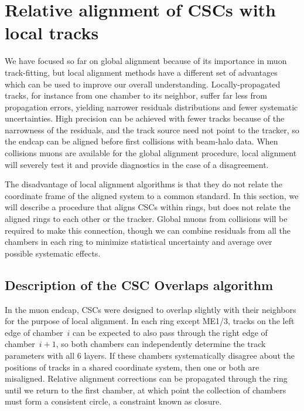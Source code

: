 \documentclass[12pt]{article}
\begin{document}
\section{Relative alignment of CSCs with local tracks}

We have focused so far on global alignment because of its importance
in muon track-fitting, but local alignment methods have a different
set of advantages which can be used to improve our overall
understanding.  Locally-propagated tracks, for instance from one
chamber to its neighbor, suffer far less from propagation errors,
yielding narrower residuals distributions and fewer systematic
uncertainties.  High precision can be achieved with fewer tracks
because of the narrowness of the residuals, and the track source need
not point to the tracker, so the endcap can be aligned before first
collisions with beam-halo data.  When collisions muons are available
for the global alignment procedure, local alignment will severely test
it and provide diagnostics in the case of a disagreement.

The disadvantage of local alignment algorithms is that they do not
relate the coordinate frame of the aligned system to a common
standard.  In this section, we will describe a procedure that aligns
CSCs within rings, but does not relate the aligned rings to each other
or the tracker.  Global muons from collisions will be required to make
this connection, though we can combine residuals from all the chambers
in each ring to minimize statistical uncertainty and average over
possible systematic effects.

\subsection{Description of the CSC Overlaps algorithm}
\label{sec:overlaps_algorithm}

In the muon endcap, CSCs were designed to overlap slightly with their
neighbors for the purpose of local alignment.  In each ring except
ME1/3, tracks on the left edge of chamber~$i$ can be expected to also
pass through the right edge of chamber~$i+1$, so both chambers can
independently determine the track parameters with all 6 layers.  If
these chambers systematically disagree about the positions of tracks
in a shared coordinate system, then one or both are misaligned.
Relative alignment corrections can be propagated through the ring
until we return to the first chamber, at which point the collection of
chambers must form a consistent circle, a constraint known as closure.
\end{document}
